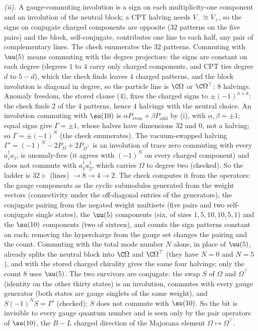 \emph{(ii).} A gauge-commuting involution is a sign on each multiplicity-one component and an involution of the neutral block; a CPT halving needs $V_{-} \cong \bar{V}_{+}$, so the signs on conjugate charged components are opposite ($32$ patterns on the five pairs) and the block, self-conjugate, contributes one line to each half, any pair of complementary lines. The check enumerates the $32$ patterns. Commuting with $\uu(5)$ means commuting with the degree projectors: the signs are constant on each degree (degrees $1$ to $4$ carry only charged components, and CPT ties degree $d$ to $5 - d$), which the check finds leaves $4$ charged patterns, and the block involution is diagonal in degree, so the particle line is $\C\Omega$ or $\C\Omega^{\top}$: $8$ halvings. Anomaly freedom, the stored clause (4), fixes the charged signs to $\pm(-1)^{n + k}$: the check finds $2$ of the $4$ patterns, hence $4$ halvings with the neutral choice. An involution commuting with $\so(10)$ is $\alpha P_{\mathrm{even}} + \beta P_{\mathrm{odd}}$ by (i), with $\alpha, \beta = \pm1$; equal signs give $\Gamma = \pm1$, whose halves have dimensions $32$ and $0$, not a halving; so $\Gamma = \pm(-1)^{N}$ (the check enumerates). The vacuum-swapped halving $\Gamma' = (-1)^{N} - 2P_{\Omega} + 2P_{\Omega^{\top}}$ is an involution of trace zero commuting with every $a^{\dagger}_{i}a_{j}$, is anomaly-free (it agrees with $(-1)^{N}$ on every charged component) and does not commute with $a^{\dagger}_{1}a^{\dagger}_{2}$, which carries $\Omega$ to degree two (checked). So the ladder is $32 \times$ (lines) $\to 8 \to 4 \to 2$. The check computes it from the operators: the gauge components as the cyclic submodules generated from the weight vectors (connectivity under the off-diagonal entries of the generators), the conjugate pairing from the negated weight multisets (five pairs and two self-conjugate single states), the $\uu(5)$ components (six, of sizes $1, 5, 10, 10, 5, 1$) and the $\so(10)$ components (two of sixteen), and counts the sign patterns constant on each; removing the hypercharge from the gauge set changes the pairing and the count. Commuting with the total mode number $N$ alone, in place of $\uu(5)$, already splits the neutral block into $\C\Omega$ and $\C\Omega^{\top}$ (they have $N = 0$ and $N = 5$), and with the stored charged chirality gives the same four halvings; only the count $8$ uses $\uu(5)$. The two survivors are conjugate: the swap $S$ of $\Omega$ and $\Omega^{\top}$ (identity on the other thirty states) is an involution, commutes with every gauge generator (both states are gauge singlets of the same weight), and $S(-1)^{N}S = \Gamma'$ (checked); $S$ does not commute with $\so(10)$. So the bit is invisible to every gauge quantum number and is seen only by the pair operators of $\so(10)$, the $B - L$ charged direction of the Majorana element $\Omega \mapsto \Omega^{\top}$.

